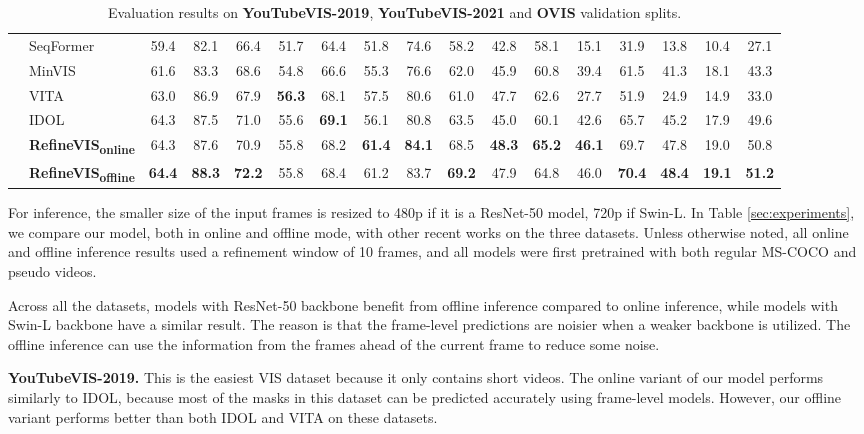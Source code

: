 \begin{table*}[t]
\begin{tabular}{l|l|ccccc|ccccc|ccccc}
        \midrule
		\parbox[t]{2mm}{}
		& SeqFormer~\cite{wu2021seqformer} & 59.4 & 82.1 & 66.4 & 51.7 & 64.4 & 51.8 & 74.6 & 58.2 & 42.8 & 58.1  & 15.1 & 31.9 &13.8 & 10.4 & 27.1 \\
        & MinVIS~\cite{huang2022minvis} & 61.6 & 83.3 & 68.6 & 54.8 & 66.6 & 55.3 & 76.6 & 62.0 & 45.9 & 60.8 & 39.4 & 61.5 & 41.3 & 18.1 & 43.3 \\
		& VITA~\cite{heo2022vita} & 63.0  & 86.9  & 67.9 & \textbf{56.3}  & 68.1 & 57.5 & 80.6 & 61.0 & 47.7 & 62.6 & 27.7 & 51.9 & 24.9 & 14.9 & 33.0\\
        & IDOL~\cite{IDOL} & 64.3 &  87.5 & 71.0 & 55.6 & \textbf{69.1} & 56.1 & 80.8 & 63.5 & 45.0 & 60.1 & 42.6 & 65.7 &  45.2 & 17.9  & 49.6 \\
& \textbf{RefineVIS\textsubscript{online}} & 64.3 & 87.6 & 70.9 & 55.8 & 68.2 & \textbf{61.4} & \textbf{84.1} & 68.5 & \textbf{48.3} & \textbf{65.2} & \textbf{46.1} & 69.7 & 47.8 & 19.0 & 50.8 \\
		& \textbf{RefineVIS\textsubscript{offline}} & \textbf{64.4} & \textbf{88.3} & \textbf{72.2} & 55.8 & 68.4 & 61.2 & 83.7 & \textbf{69.2} & 47.9 & 64.8 & 46.0 & \textbf{70.4} & \textbf{48.4} & \textbf{19.1} & \textbf{51.2} \\
		\bottomrule
	\end{tabular}
	\caption{Evaluation results on \textbf{YouTubeVIS-2019}, \textbf{YouTubeVIS-2021} and \textbf{OVIS} validation splits.}
	\label{tab:ytvis2021}
\end{table*}

For inference, the smaller size of the input frames is resized to 480p if it is a ResNet-50 model, 720p if Swin-L.
In Table \ref{sec:experiments}, we compare our model, both in online and offline mode, with other recent works on the three datasets.
Unless otherwise noted, all online and offline inference results used a refinement window of 10 frames, and all models were first pretrained with both regular MS-COCO and pseudo videos.

Across all the datasets, models with ResNet-50 backbone benefit from offline inference compared to online inference, while models with Swin-L backbone have a similar result.
The reason is that the frame-level predictions are noisier when a weaker backbone is utilized. The offline inference can use the information from the frames ahead of the current frame to reduce some noise. 


\textbf{YouTubeVIS-2019.} This is the easiest VIS dataset because it only contains short videos. The online variant of our model performs similarly to IDOL, because most of the masks in this dataset can be predicted accurately using frame-level models. However, our offline variant performs better than both IDOL and VITA on these datasets.


